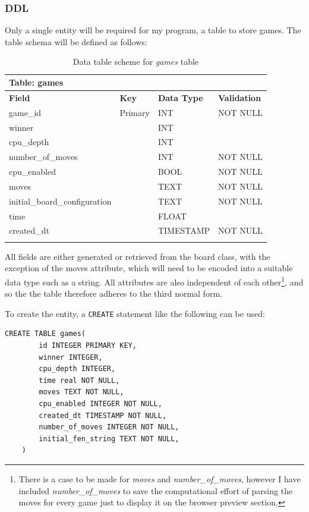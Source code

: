 \documentclass[../main/main.tex]{subfiles}
\begin{document}
\subsubsection*{DDL}
\label{sec:design-ddl}
Only a single entity will be required for my program, a table to store games. The table schema will be defined as follows:

\begin{longtable}[c]{l|l|l|l}
    \multicolumn{4}{l}{\textbf{Table: games}}\\
    \toprule
    \textbf{Field} & \textbf{Key} & \textbf{Data Type} & \textbf{Validation}\\
    \midrule
    \endfirsthead
    \endhead

    game\_id & Primary & INT & NOT NULL\\
    winner &  & INT & \\
    cpu\_depth &  & INT & \\
    number\_of\_moves &  & INT & NOT NULL\\
    cpu\_enabled &  & BOOL & NOT NULL\\
    moves &  & TEXT & NOT NULL\\
    initial\_board\_configuration &  & TEXT & NOT NULL\\
    time &  & FLOAT & \\
    created\_dt &  & TIMESTAMP & NOT NULL\\

    \bottomrule

\caption{Data table scheme for \textit{games} table}
\label{tab:games-schema}
\end{longtable}

All fields are either generated or retrieved from the board class, with the exception of the moves attribute, which will need to be encoded into a suitable data type such as a string. All attributes are also independent of each other\footnote{There is a case to be made for \textit{moves} and \textit{number\_of\_moves}, however I have included \textit{number\_of\_moves} to save the computational effort of parsing the moves for every game just to display it on the browser preview section.}, and so the the table therefore adheres to the third normal form.

To create the entity, a \lstinline[language=sqlite]{CREATE} statement like the following can be used:

\begin{lstlisting}[language=sqlite, frame=lines]
    CREATE TABLE games(
        id INTEGER PRIMARY KEY,
        winner INTEGER,
        cpu_depth INTEGER,
        time real NOT NULL,
        moves TEXT NOT NULL,
        cpu_enabled INTEGER NOT NULL,
        created_dt TIMESTAMP NOT NULL,
        number_of_moves INTEGER NOT NULL,
        initial_fen_string TEXT NOT NULL,
    )
\end{lstlisting}
\end{document}
